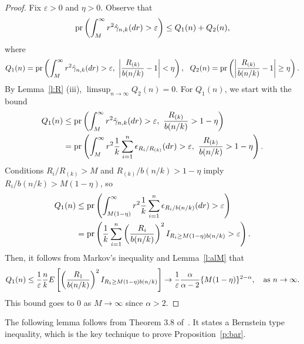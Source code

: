 \documentclass[lineno]{biometrika}
\newcommand \ag{\alpha}
\newcommand \ga{\gamma}
\newcommand \eg{\varepsilon}
\newcommand \ep{\epsilon}
\newcommand\lp{\left (}
\newcommand\rp{\right )}
\newcommand\lb{\left [}
\newcommand\rb{\right ]}
\begin{document}
\begin{proof}
Fix $\eg> 0$ and $\eta> 0$. Observe that
\[
{\rm pr}\lp \int_M^\infty r^2 \hat\ga_{n,k}(dr) > \eg \rp
 \le Q_1(n) + Q_2(n),
\]
where
\[
Q_1(n) = {\rm pr}\lp \int_M^\infty r^2 \hat\ga_{n,k}(dr) > \eg, \
\left | \frac{R_{(k)}}{b(n/k)} - 1 \right |  < \eta \rp,\ \
Q_2(n) = {\rm pr}\lp \left | \frac{R_{(k)}}{b(n/k)} - 1 \right |  \ge  \eta\rp.
\]
By Lemma~\ref{l:R} (iii), $ \limsup_{n\to\infty} Q_2(n) = 0$. For $Q_1(n)$, we start with the bound
\begin{align*}
Q_1(n)
&\le {\rm pr}\lp  \int_M^\infty r^2 \hat\ga_{n,k}(dr) > \eg, \
\frac{R_{(k)}}{b(n/k)} > 1- \eta \rp\\
&= {\rm pr} \lp  \int_M^\infty r^2 \frac{1}{k} \sum_{i=1}^n
\ep_{R_i/ R_{(k)}}(dr)  > \eg, \
\frac{R_{(k)}}{b(n/k)} > 1- \eta \rp.
\end{align*}
Conditions $R_i/ R_{(k)} > M$ and ${R_{(k)}}/{b(n/k)} > 1- \eta$
imply ${R_{i}}/{b(n/k)} > M(1- \eta)$, so
\begin{align*}
Q_1(n)
&\le {\rm pr} \lp  \int_{M(1-\eta)}^\infty r^2 \frac{1}{k} \sum_{i=1}^n
\ep_{R_i/b(n/k)}(dr)   > \eg \rp\\
&= {\rm pr} \lp  \frac{1}{k} \sum_{i=1}^n  \lp \frac{R_i}{b(n/k)} \rp^2
I_{R_i \ge M(1-\eta)b(n/k) } >\eg\rp.
\end{align*}
Then, it follows from Markov's inequality and Lemma~\ref{l:alM} that
\[
Q_1(n) \le \frac{1}{\eg} \frac{n}{k} E \lb \lp \frac{R_1}{b(n/k)} \rp^2
I_{R_1 \ge M(1-\eta)b(n/k) } \rb  \to \frac{1}{\eg} \frac{\ag}{\ag-2} \{M(1-\eta)\}^{2-\ag}, \ \ \ {\rm as} \ n \to \infty.
\]
This bound goes to 0 as $M \to \infty$ since $\ag>2$.
\end{proof}



The following lemma follows from Theorem 3.8 of~\citet{mcdiarmid:1998}. It states a Bernstein type inequality, which is the key technique to prove Proposition~\ref{p:bar}.
\end{document}
